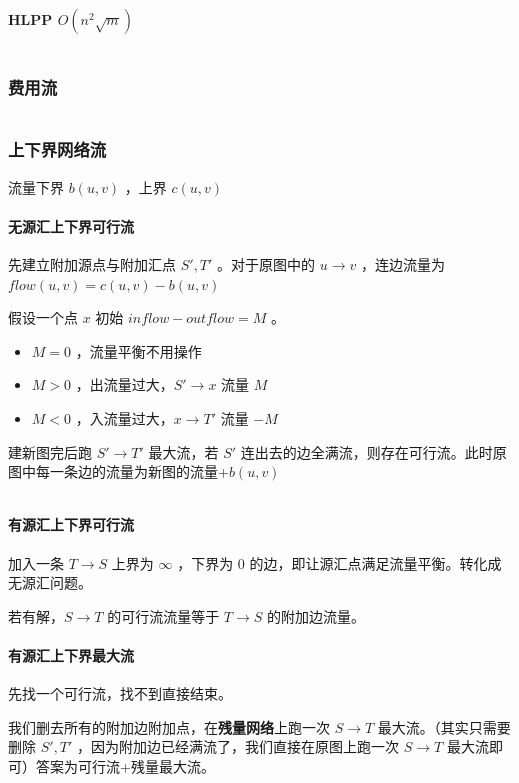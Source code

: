 \documentclass[a4paper,11pt]{article}
\begin{document}
\paragraph{HLPP \(O(n^2\sqrt m)\)}
\inputminted[linenos]{c++}{graph/hlpp.cpp}
\subsubsection{费用流}
\inputminted[linenos]{c++}{graph/MCMF.cpp}
\subsubsection{上下界网络流}
流量下界 \(b(u,v)\) ，上界 \(c(u,v)\)
\paragraph{无源汇上下界可行流}
先建立附加源点与附加汇点 \(S',T'\) 。对于原图中的 \(u\to v\)
，连边流量为 \(flow(u,v)=c(u,v)-b(u,v)\)

假设一个点 \(x\) 初始 \(inflow-outflow=M\) 。

\begin{itemize}
\item
  \(M=0\) ，流量平衡不用操作
\item
  \(M>0\) ，出流量过大，\(S'\to x\) 流量 \(M\) 
\item
  \(M<0\) ，入流量过大，\(x\to T'\) 流量 \(-M\) 
\end{itemize}

建新图完后跑 \(S'\to T'\) 最大流，若 \(S'\)
连出去的边全满流，则存在可行流。此时原图中每一条边的流量为新图的流量+\(b(u,v)\)
\inputminted[linenos,breaklines]{c++}{graph/updownaviflow.cpp}

\paragraph{有源汇上下界可行流}
加入一条 \(T\to S\) 上界为 \(\infty\) ，下界为 \(0\)
的边，即让源汇点满足流量平衡。转化成无源汇问题。

若有解，\(S\to T\) 的可行流流量等于 \(T\to S\) 的附加边流量。
\paragraph{有源汇上下界最大流}
先找一个可行流，找不到直接结束。

我们删去所有的附加边附加点，在\textbf{残量网络}上跑一次 \(S\to T\)
最大流。（其实只需要删除 \(S',T'\)
，因为附加边已经满流了，我们直接在原图上跑一次 \(S\to T\)
最大流即可）答案为可行流+残量最大流。
\inputminted[linenos,breaklines]{c++}{graph/updownmaxflow.cpp}
\end{document}
